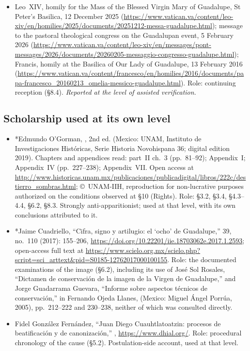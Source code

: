 \begin{itemize}
\url{https://www.vatican.va/archive/ENG0015/__PH.HTM}. Role: \S9.1.
\item Leo~XIV, homily for the Mass of the Blessed Virgin Mary of
Guadalupe, St Peter's Basilica, 12 December 2025
(\url{https://www.vatican.va/content/leo-xiv/en/homilies/2025/documents/20251212-messa-guadalupe.html});
message to the pastoral theological congress on the Guadalupan event,
5 February 2026
(\url{https://www.vatican.va/content/leo-xiv/en/messages/pont-messages/2026/documents/20260205-messaggio-congresso-guadalupe.html});
Francis, homily at the Basilica of Our Lady of Guadalupe, 13 February
2016
(\url{https://www.vatican.va/content/francesco/en/homilies/2016/documents/papa-francesco_20160213_omelia-messico-guadalupe.html}).
Role: continuing reception (\S8.4). \emph{Reported at the level of
assisted verification.}
\end{itemize}

\subsection*{Scholarship used at its own level}

\begin{itemize}
\item *Edmundo O'Gorman, ,
2nd ed. (Mexico: UNAM, Instituto de Investigaciones Hist\'oricas,
Serie Historia Novohispana 36; digital edition 2019). Chapters and
appendices read: part~II ch.~3 (pp.~81--92); Appendix~I; Appendix~IV
(pp.~227--238); Appendix~VII. Open access at
\url{http://www.historicas.unam.mx/publicaciones/publicadigital/libros/222c/destierro_sombras.html};
\copyright\ UNAM-IIH, reproduction for non-lucrative purposes
authorized on the conditions observed at \S10 (Rights). Role: \S3.2,
\S3.4, \S4.3--4.4, \S6.2, \S8.3. Strongly anti-apparitionist; used at
that level, with its own conclusions attributed to it.
\item *Jaime Cuadriello, ``Cifra, signo y artilugio: el `ocho' de
Guadalupe,''  39, no.~110 (2017): 155--206,
\url{https://doi.org/10.22201/iie.18703062e.2017.1.2593}; open-access
full text at
\url{https://www.scielo.org.mx/scielo.php?script=sci_arttext&pid=S0185-12762017000100155}.
Role: the documented examinations of the image (\S6.2), including its
use of Jos\'e Sol Rosales, ``Dictamen de conservaci\'on de la imagen
de la Virgen de Guadalupe,'' and Jorge Guadarrama Guevara, ``Informe
sobre aspectos t\'ecnicos de conservaci\'on,'' in Fernando Ojeda
Llanes,  (Mexico:
Miguel \'Angel Porr\'ua, 2005), pp.~212--222 and 230--238, neither of
which was consulted directly.
\item Fidel Gonz\'alez Fern\'andez, ``Juan Diego Cuauhtlatoatzin:
procesos de beatificaci\'on y de canonizaci\'on,'' ,
\url{https://www.dhial.org/}. Role: procedural chronology of the cause
(\S5.2). Postulation-side account, used at that level.
\end{itemize}

